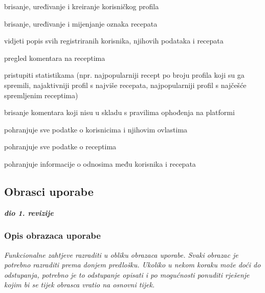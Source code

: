 \begin{packed_enum}
\begin{packed_enum}
				\end{packed_enum}

				\item  {}
				\begin{packed_enum}

					\item brisanje, uređivanje i kreiranje korisničkog profila
					\item brisanje, uređivanje i mijenjanje oznaka recepata
					\item vidjeti popis svih registriranih korisnika, njihovih podataka i recepata
					\item pregled komentara na receptima
					\item pristupiti statistikama (npr. najpopularniji recept po broju profila koji su ga spremili, najaktivniji profil s najviše recepata, najpopularniji profil s najčešće spremljenim receptima)
					\item brisanje komentara koji nisu u skladu s pravilima ophođenja na platformi

				\end{packed_enum}
			
				\item  {}
				
				\begin{packed_enum}
					
					\item pohranjuje sve podatke o korisnicima i njihovim ovlastima
					\item pohranjuje sve podatke o receptima
					\item pohranjuje informacije o odnosima među korisnika i recepata
					
				\end{packed_enum}
			\end{packed_enum}
			
			\eject 
			
			
				
			\subsection{Obrasci uporabe}
				
				\textbf{\textit{dio 1. revizije}}
				
				\subsubsection{Opis obrazaca uporabe}
					\textit{Funkcionalne zahtjeve razraditi u obliku obrazaca uporabe. Svaki obrazac je potrebno razraditi prema donjem predlošku. Ukoliko u nekom koraku može doći do odstupanja, potrebno je to odstupanje opisati i po mogućnosti ponuditi rješenje kojim bi se tijek obrasca vratio na osnovni tijek.}\\
					

